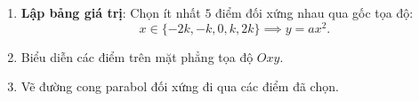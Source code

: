 \begin{enumerate}
\item \textbf{Lập bảng giá trị}: Chọn ít nhất $5$ điểm đối xứng nhau qua gốc tọa độ:
$$x \in \{-2k, -k, 0, k, 2k\} \implies y = ax^2.$$
\item Biểu diễn các điểm trên mặt phẳng tọa độ $Oxy$.
\item Vẽ đường cong parabol đối xứng đi qua các điểm đã chọn.
\end{enumerate}

